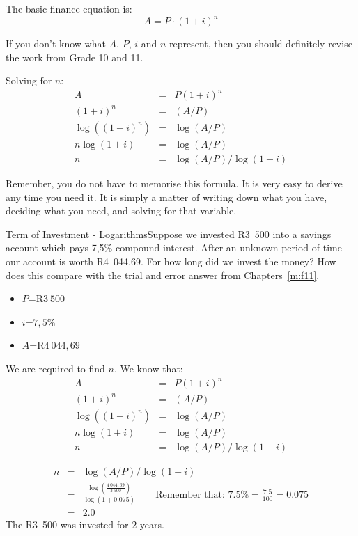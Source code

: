 The basic finance equation is:
\begin{equation*}
A = P \cdot (1+i)^n
\end{equation*}

If you don't know what $A$, $P$, $i$ and $n$ represent, then you should definitely revise the work from Grade 10 and 11.

Solving for $n$:
\begin{eqnarray*}
A &=& P(1+i)^n\\
(1+i)^n &=& (A/P)\\
\log((1+i)^n)&=&\log(A/P)\\
n\log(1+i)&=&\log(A/P)\\
n &=& \log(A/P) / \log(1+i)
\end{eqnarray*}

Remember, you do not have to memorise this formula. It is very easy to derive any time you need it. It is simply a matter of writing down what you have, deciding what you need, and solving for that variable.

\begin{wex}{Term of Investment - Logarithms}{Suppose we invested R3~500 into a savings account which pays 7,5\% compound interest. After an unknown period of time our account is worth R4~044,69. For how long did we invest the money? How does this compare with the trial and error answer from Chapters~\ref{m:f11}.}{
\begin{itemize}
\item{$P$=R$3~500$}
\item{$i$=$7,5$\%}
\item{$A$=R$4~044,69$}
\end{itemize}
We are required to find $n$.
We know that:
\begin{eqnarray*}
A &=& P(1+i)^n\\
(1+i)^n &=& (A/P)\\
\log((1+i)^n)&=&\log(A/P)\\
n\log(1+i)&=&\log(A/P)\\
n &=& \log(A/P) / \log(1+i)
\end{eqnarray*}

\begin{eqnarray*}
n &=& \log(A/P) / \log(1+i)\\
&=&\frac{\log(\frac{4~044,69}{3~500})}{\log(1+0.075)}\qquad \mbox{Remember that: }7.5\%=\frac{7.5}{100}=0.075\\
&=&2.0
\end{eqnarray*}
The R3~500 was invested for 2 years.}
\end{wex}

